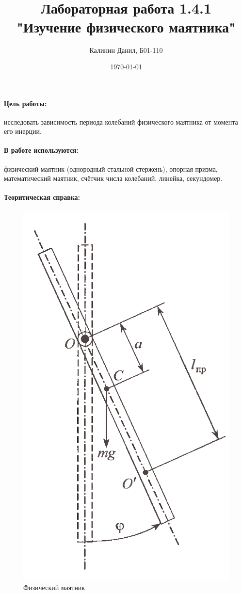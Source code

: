 \documentclass[a4paper, 12pt]{article}
\author{Калинин Данил, Б01-110}
\date{\today}
\title{Лабораторная работа 1.4.1 \\"Изучение физического маятника"}
\newcommand{\parag}[1]{\paragraph*{#1:}}
\begin{document}
\maketitle

\parag {Цель работы}
исследовать зависимость периода колебаний физического маятника от момента его инерции.
\parag {В работе используются}
физический маятник (однородный стальной стержень), опорная призма, математический маятник, счётчик числа колебаний, линейка, секундомер.

\parag {Теоритическая справка}

\begin{figure}
	\includegraphics[width=\linewidth]{ustanovka.png}
	\caption{Физический маятник}
    \label{pic:risunok}
\end{figure}
\end{document}
